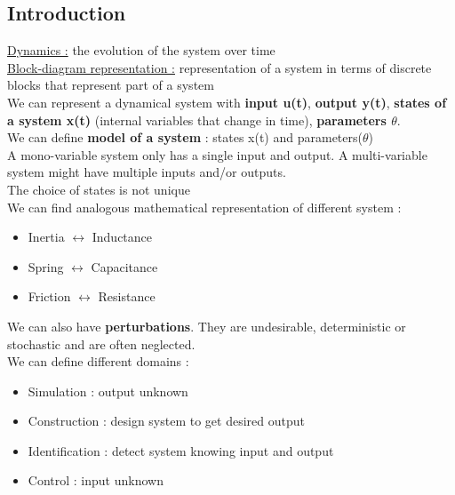 \documentclass[../main.tex]{subfiles}
\begin{document}
\localtableofcontents
\subsection{Introduction}
\underline{Dynamics :} the evolution of the system over time\\
\underline{Block-diagram representation :} representation of a system in terms of discrete blocks that represent part of a system\\

We can represent a dynamical system with \textbf{input u(t)}, \textbf{output y(t)}, \textbf{states of a system x(t)} (internal variables that change in time), \textbf{parameters $\theta$}.\\
We can define \textbf{model of a system} : states x(t) and parameters($\theta$)\\
A mono-variable system only has a single input and output. A multi-variable system might have multiple inputs and/or outputs.\\

\warning The choice of states is not unique\\
We can find analogous mathematical representation of different system :\\
\begin{itemize}
    \item Inertia $\leftrightarrow$ Inductance\\
    \item Spring $\leftrightarrow$ Capacitance\\
    \item Friction $\leftrightarrow$ Resistance\\
\end{itemize}

We can also have \textbf{perturbations}. They are undesirable, deterministic or stochastic and are often neglected.\\

We can define different domains : \\
\begin{itemize}
    \item Simulation : output unknown\\
    \item Construction : design system to get desired output\\
    \item Identification : detect system knowing input and output\\
    \item Control : input unknown\\
\end{itemize}
\end{document}
